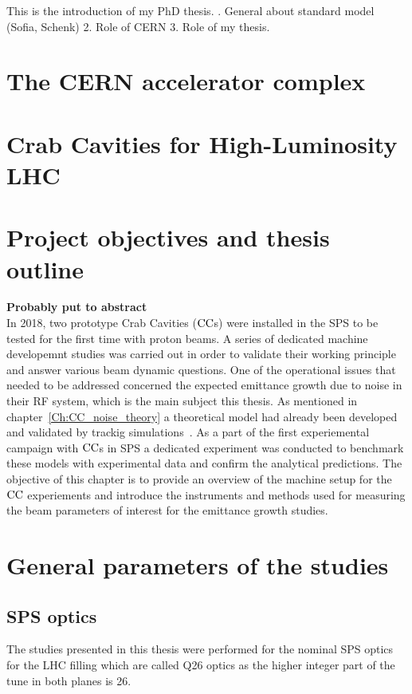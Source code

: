 This is the introduction of my PhD thesis.
. General about standard model (Sofia, Schenk)
2. Role of CERN
3. Role of my thesis.

\section{The CERN accelerator complex}



 


\section{Crab Cavities for High-Luminosity LHC}


\section{Project objectives and thesis outline}

\textbf{Probably put to abstract}\\
In 2018, two prototype Crab Cavities (${\mathrm{CC}}$s) were installed in the SPS to be tested for the first time with proton beams. A series of dedicated machine developemnt studies was carried out in order to validate their working principle and answer various beam dynamic questions. One of the operational issues that needed to be addressed concerned the expected emittance growth due to noise in their RF system, which is the main subject this thesis.  As mentioned in chapter~\ref{Ch:CC_noise_theory} a theoretical model had already been developed and validated by trackig simulations~\cite{PhysRevSTAB.18.101001}. 
As a part of the first experiemental campaign with ${\mathrm{CC}}$s in SPS a dedicated experiment was conducted to benchmark these models with experimental data and confirm the analytical predictions. The objective of this chapter is to provide an overview of the machine setup for the ${\mathrm{CC}}$ experiements and introduce the instruments and methods used for measuring the beam parameters of interest for the emittance growth studies.

\section{General parameters of the studies}
\subsection{SPS optics}
 The studies presented in this thesis were performed for the nominal SPS optics for the LHC filling which are called Q26 optics as the higher integer part of the tune in both planes is 26. 

